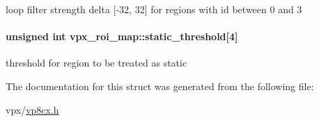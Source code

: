 \label{structvpx__roi__map_a5164be48a612bf872b81e0a86726fbed}
loop filter strength delta \mbox{[}-\/32, 32\mbox{]} for regions with id between 0 and 3 \hypertarget{structvpx__roi__map_a3354ff458e229361b53a0b2d1bf68cfb}{
\paragraph[{static\-\_\-threshold}]{\setlength{\rightskip}{0pt plus 5cm}unsigned int {\bf vpx\-\_\-roi\-\_\-map\-::static\-\_\-threshold}\mbox{[}4\mbox{]}}}
\label{structvpx__roi__map_a3354ff458e229361b53a0b2d1bf68cfb}
threshold for region to be treated as static 

\-The documentation for this struct was generated from the following file\-:\begin{DoxyCompactItemize}
\item 
vpx/\hyperlink{vp8cx_8h}{vp8cx.\-h}\end{DoxyCompactItemize}
